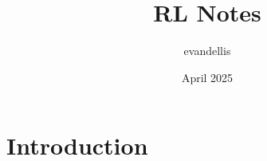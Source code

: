 \documentclass{article}
\title{RL Notes}
\author{evandellis }
\date{April 2025}
\begin{document}
\maketitle

\section{Introduction}
\end{document}
